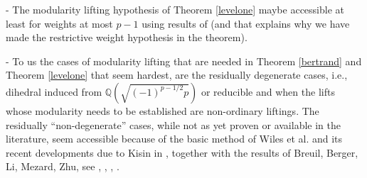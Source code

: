 \documentclass[12pt]{article}
\newcommand{\Q}{\mathbb{Q}}
\begin{document}


- The modularity lifting hypothesis of Theorem \ref{levelone}
 maybe accessible at least for weights at most $p-1$ using results of
\cite{BM} (and that explains why we have made the restrictive weight
 hypothesis in the theorem).


- To us the cases of modularity lifting that are needed  in Theorem
\ref{bertrand}
and Theorem \ref{levelone} that seem hardest, are the residually degenerate
cases, i.e., dihedral induced from $\Q(\sqrt { {(-1)} ^{p-1/2} p})$ or
reducible and when the lifts whose modularity needs
to be established are non-ordinary liftings. The residually
``non-degenerate''
cases, while not as yet proven or available in the literature, seem
accessible
because of the basic method of Wiles et al. and its recent
developments due to Kisin
in \cite{Kisin}, together with the results
of Breuil, Berger, Li, Mezard, Zhu, see
\cite{Breuil}, \cite{Berger}, \cite{BLZ}, \cite{BM}.
\end{document}
